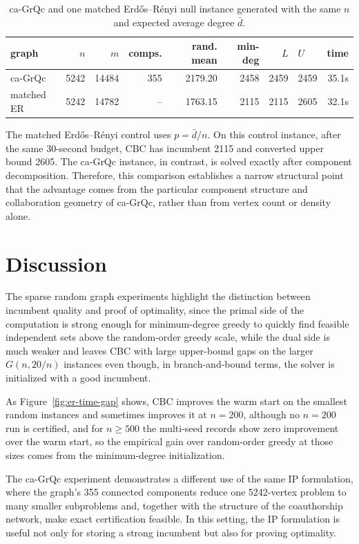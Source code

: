 \documentclass[11pt]{article}
\begin{document}
\begin{table}[h]
\centering
\caption{ca-GrQc and one matched Erdős--Rényi null instance generated with the
same $n$ and expected average degree $\bar d$.}
\label{tab:matched}
\scriptsize
\setlength{\tabcolsep}{4pt}
\begin{tabular}{lrrrrrrlr}
\toprule
graph & $n$ & $m$ & comps. & rand. mean & min-deg & $L$ & $U$ & time \\
\midrule
ca-GrQc & 5242 & 14484 & 355 & 2179.20 & 2458 & 2459 & 2459 & 35.1s \\
matched ER & 5242 & 14782 & -- & 1763.15 & 2115 & 2115 & 2605 & 32.1s \\
\bottomrule
\end{tabular}
\end{table}

The matched Erdős--Rényi control uses $p=\bar d/n$.  On this control instance,
after the same 30-second budget, CBC has incumbent 2115 and converted upper
bound 2605.  The ca-GrQc instance, in contrast, is solved exactly after
component decomposition. Therefore, this comparison establishes a narrow structural point that the
advantage comes from the particular component structure and collaboration
geometry of ca-GrQc, rather than from vertex count or density alone.

\section{Discussion}

The sparse random graph experiments highlight the distinction between
incumbent quality and proof of optimality, since the primal side of the
computation is strong enough for minimum-degree greedy to quickly find feasible
independent sets above the random-order greedy scale, while the dual side is
much weaker and leaves CBC with large upper-bound gaps on the larger
$G(n,20/n)$ instances even though, in branch-and-bound terms, the solver is
initialized with a good incumbent.

As Figure~\ref{fig:er-time-gap} shows, CBC improves the warm start on the
smallest random instances and sometimes improves it at $n=200$, although no
$n=200$ run is certified, and for $n\ge 500$ the multi-seed records show zero
improvement over the warm start, so the empirical gain over random-order greedy
at those sizes comes from the minimum-degree initialization.

The ca-GrQc experiment demonstrates a different use of the same IP formulation,
where the graph's 355 connected components reduce one 5242-vertex problem to
many smaller subproblems and, together with the structure of the coauthorship
network, make exact certification feasible.  In this setting, the IP
formulation is useful not only for storing a strong incumbent but also for
proving optimality.
\end{document}

